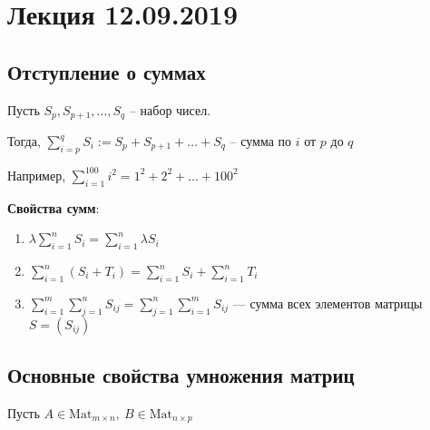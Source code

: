 \section{Лекция 12.09.2019}

\subsection{Отступление о суммах}

Пусть $S_p, S_{p + 1}, \dots, S_q$ -- набор чисел.

\bigskip
Тогда, $\sum_{i = p}^q S_i := S_p + S_{p + 1} + \dots + S_q $ -- сумма по $i$ от $p$ до $q$

\bigskip
Например, $\sum_{i=1}^{100} i^2 = 1^2 + 2^2 + \dots + 100^2$

\bigskip
\textbf{Свойства сумм}:
\begin{enumerate}
    \item $\lambda \sum_{i=1}^n S_i = \sum_{i=1}^n \lambda S_i $
    \item $\sum_{i=1}^n (S_i + T_i) = \sum_{i=1}^n S_i + \sum^n_{i=1} T_i $
    \item $\sum_{i=1}^m \sum_{j=1}^n S_{ij} = \sum_{j=1}^n \sum_{i=1}^m S_{ij}$ --- сумма всех элементов матрицы $S = (S_{ij})$
\end{enumerate}

\subsection{Основные свойства умножения матриц}

Пусть $A \in \text{Mat}_{m \times n}, \ B \in \text{Mat}_{n \times p}$

